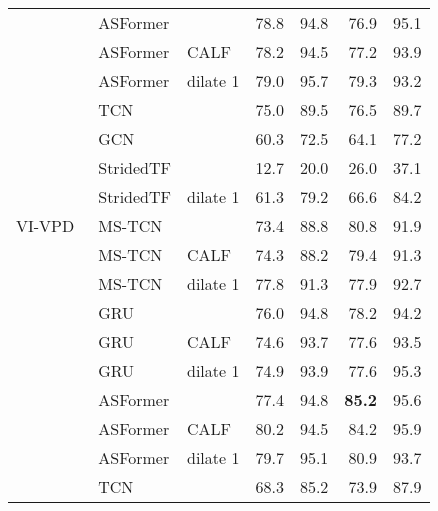 \documentclass[runningheads]{llncs}
\newcommand{\sota}[1]{\textbf{#1}}
\newcommand{\nms}{\textsuperscript{\textdagger}}
\begin{document}
\begin{table}[tp]
{\begin{tabularx}{0.87\textwidth}{lll
        rr
        rr
    }
        \cmidrule{2-7}
        & ASFormer &
            & 78.8 & \nms 94.8 & 76.9 & \nms 95.1 \\
        & ASFormer & CALF
            & 78.2 & \nms 94.5 & 77.2 & \nms 93.9 \\
        & ASFormer & dilate 1
            & \nms 79.0 & \nms 95.7 & 79.3 & \nms 93.2 \\

        \cmidrule{2-7}
        & TCN &
            & \nms 75.0 & \nms 89.5 & \nms 76.5 & \nms 89.7 \\

        & GCN &
            & \nms 60.3 & \nms 72.5 & \nms 64.1 & \nms 77.2 \\

        \cmidrule{2-7}
        & StridedTF &
            & \nms 12.7 & \nms 20.0 & \nms 26.0 & \nms 37.1 \\

        & StridedTF & dilate 1
            & \nms 61.3 & \nms 79.2 & \nms 66.6 & \nms 84.2 \\

        \cmidrule{2-7}
        VI-VPD~\cite{vpd}
        & MS-TCN &
            & 73.4 & \nms 88.8 & 80.8 & \nms 91.9 \\

        & MS-TCN & CALF
            & 74.3 & 88.2 & 79.4 & \nms 91.3 \\

        & MS-TCN & dilate 1
            & 77.8 & \nms 91.3 & 77.9 & \nms 92.7 \\

        \cmidrule{2-7}
        & GRU &
            & 76.0 & \nms 94.8 & 78.2 & \nms 94.2 \\

        & GRU & CALF
            & \nms 74.6 & \nms 93.7 & \nms 77.6 & \nms 93.5 \\

        & GRU & dilate 1
            & \nms 74.9 & \nms 93.9 & \nms 77.6 & \nms 95.3 \\

        \cmidrule{2-7}
        & ASFormer &
            & 77.4 & \nms 94.8 & \sota{85.2} & \nms 95.6 \\
        & ASFormer & CALF
            & 80.2 & \nms 94.5 & 84.2 & \nms 95.9 \\
        & ASFormer & dilate 1
            & 79.7 & \nms 95.1 & 80.9 & \nms 93.7 \\

        \cmidrule{2-7}
        & TCN &
            & \nms 68.3 & \nms 85.2 & \nms 73.9 & \nms 87.9 \\


\end{tabularx}}
\end{table}
\end{document}
